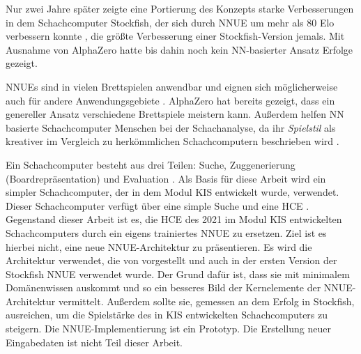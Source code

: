 Nur zwei Jahre später zeigte eine Portierung des Konzepts starke Verbesserungen in dem Schachcomputer Stockfish, der sich durch \ac{NNUE} um mehr als 80 Elo verbessern konnte \cite{StockfishIntroducingNNUE}, die größte Verbesserung einer Stockfish-Version jemals. Mit Ausnahme von AlphaZero \cite{Silver2017} hatte bis dahin noch kein \ac{NN}-basierter Ansatz Erfolge gezeigt.

\acp{NNUE} sind in vielen Brettspielen anwendbar und eignen sich möglicherweise auch für andere Anwendungsgebiete \cite{StockfishNNUE}. AlphaZero \cite{Silver2017} hat bereits gezeigt, dass ein genereller Ansatz verschiedene Brettspiele meistern kann. Außerdem helfen \ac{NN} basierte Schachcomputer Menschen bei der Schachanalyse, da ihr \emph{Spielstil} als kreativer im Vergleich zu herkömmlichen Schachcomputern beschrieben wird \cite{Kasparov2018}.

Ein Schachcomputer besteht aus drei Teilen: Suche, Zuggenerierung (Boardrepräsentation) und Evaluation \cite{VazquezFernandez2013}. Als Basis für diese Arbeit wird ein simpler Schachcomputer, der in dem Modul \ac{KIS} entwickelt wurde, verwendet. Dieser Schachcomputer verfügt über eine simple Suche und eine \ac{HCE} \cite{nopy}. Gegenstand dieser Arbeit ist es, die \ac{HCE} des 2021 im Modul \ac{KIS} entwickelten Schachcomputers durch ein eigens trainiertes \ac{NNUE} zu ersetzen. Ziel ist es hierbei nicht, eine neue \ac{NNUE}-Architektur zu präsentieren. Es wird die Architektur verwendet, die von \citeauthor{YNasu2018} \cite{YNasu2018} vorgestellt und auch in der ersten Version der Stockfish \ac{NNUE} verwendet wurde. Der Grund dafür ist, dass sie mit minimalem Domänenwissen auskommt und so ein besseres Bild der Kernelemente der \ac{NNUE}-Architektur vermittelt. Außerdem sollte sie, gemessen an dem Erfolg in Stockfish, ausreichen, um die Spielstärke des in \ac{KIS} entwickelten Schachcomputers zu steigern. Die \ac{NNUE}-Implementierung ist ein Prototyp. Die Erstellung neuer Eingabedaten ist nicht Teil dieser Arbeit.